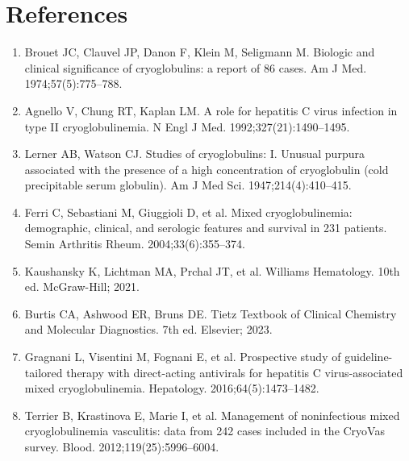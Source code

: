 \section*{References}
\begin{enumerate}
  \item Brouet JC, Clauvel JP, Danon F, Klein M, Seligmann M. Biologic and clinical significance of cryoglobulins: a report of 86 cases. Am J Med. 1974;57(5):775--788.
  \item Agnello V, Chung RT, Kaplan LM. A role for hepatitis C virus infection in type II cryoglobulinemia. N Engl J Med. 1992;327(21):1490--1495.
  \item Lerner AB, Watson CJ. Studies of cryoglobulins: I. Unusual purpura associated with the presence of a high concentration of cryoglobulin (cold precipitable serum globulin). Am J Med Sci. 1947;214(4):410--415.
  \item Ferri C, Sebastiani M, Giuggioli D, et al. Mixed cryoglobulinemia: demographic, clinical, and serologic features and survival in 231 patients. Semin Arthritis Rheum. 2004;33(6):355--374.
  \item Kaushansky K, Lichtman MA, Prchal JT, et al. Williams Hematology. 10th ed. McGraw-Hill; 2021.
  \item Burtis CA, Ashwood ER, Bruns DE. Tietz Textbook of Clinical Chemistry and Molecular Diagnostics. 7th ed. Elsevier; 2023.
  \item Gragnani L, Visentini M, Fognani E, et al. Prospective study of guideline-tailored therapy with direct-acting antivirals for hepatitis C virus-associated mixed cryoglobulinemia. Hepatology. 2016;64(5):1473--1482.
  \item Terrier B, Krastinova E, Marie I, et al. Management of noninfectious mixed cryoglobulinemia vasculitis: data from 242 cases included in the CryoVas survey. Blood. 2012;119(25):5996--6004.
\end{enumerate}

\clearpage
